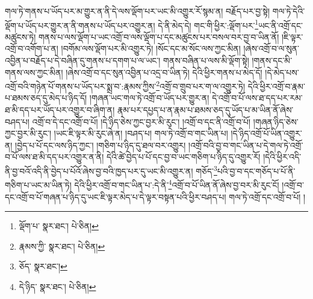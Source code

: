 གལ་ཏེ་གནས་པ་ཡོད་པར་མ་གྱུར་ན་ནི་དེ་ལས་ལྡོག་པར་ཡང་མི་འགྱུར་རོ་སྙམ་ན། བརྗོད་པར་བྱ་སྟེ། གལ་ཏེ་དེའི་ལྡོག་པ་ཡོད་པར་གྱུར་ན་ནི་གནས་པ་ཡོད་པར་འགྱུར་ན། དེ་ནི་མེད་དེ། གང་གི་ཕྱིར་:ལྡོག་པར་\footnote{ལྡོག་པ་  སྣར་ཐང་།  པེ་ཅིན། }ཡང་ནི་འགྲོ་དང་མཚུངས་ཏེ། གནས་པ་ལས་ལྡོག་པ་ཡང་འགྲོ་བ་ལས་ལྡོག་པ་དང་མཚུངས་པར་བསལ་བར་བྱ་བ་ཡིན་ནོ། །ཇི་ལྟར་འགྲོ་བ་འགོག་པ་ན། །བགོམ་ལས་ལྡོག་པར་མི་འགྱུར་ཏེ། །སོང་དང་མ་སོང་ལས་ཀྱང་མིན། །ཞེས་འགྲོ་བ་ལ་སུན་འབྱིན་པ་བརྗོད་པ་དེ་བཞིན་དུ་གནས་པ་དགག་པ་ལ་ཡང་། གནས་བཞིན་པ་ལས་མི་ལྡོག་སྟེ། །གནས་དང་མི་གནས་ལས་ཀྱང་མིན། །ཞེས་འགྲོ་བ་དང་སུན་འབྱིན་པ་འདྲ་བ་ཡིན་ཏེ། དེའི་ཕྱིར་གནས་པ་མེད་དོ། །དེ་མེད་པས་འགྲོ་བའི་གཉེན་པོ་གནས་པ་ཡོད་པར་སྨྲ་བ་:རྣམས་ཀྱིས་\footnote{རྣམས་ཀྱི་  སྣར་ཐང་།  པེ་ཅིན། }འགྲོ་བ་གྲུབ་པར་ག་ལ་འགྱུར་ཏེ། དེའི་ཕྱིར་འགྲོ་བ་རྣམ་པ་ཐམས་ཅད་དུ་མེད་པ་ཉིད་དོ། །གཞན་ཡང་གལ་ཏེ་འགྲོ་བ་ཡོད་པར་གྱུར་ན། དེ་འགྲོ་བ་པོ་ལས་ཐ་དད་པར་རམ་ཐ་མི་དད་པར་ཡོད་པར་འགྱུར་བ་ཞིག་ན། རྣམ་པར་དཔྱད་པ་ན་རྣམ་པ་ཐམས་ཅད་དུ་ཡོད་པ་མ་ཡིན་ནོ་ཞེས་བཤད་པ། འགྲོ་བ་དེ་དང་འགྲོ་བ་པོ། །དེ་ཉིད་ཅེས་ཀྱང་བྱར་མི་རུང་། །འགྲོ་བ་དང་ནི་འགྲོ་བ་པོ། །གཞན་ཉིད་ཅེས་ཀྱང་བྱར་མི་རུང་། །ཡང་ཇི་ལྟར་མི་རུང་ཞེ་ན། །བཤད་པ། གལ་ཏེ་འགྲོ་བ་གང་ཡིན་པ། །དེ་ཉིད་འགྲོ་པོ་ཡིན་འགྱུར་ན། །བྱེད་པ་པོ་དང་ལས་ཉིད་ཀྱང་། །གཅིག་པ་ཉིད་དུ་ཐལ་བར་འགྱུར། །འགྲོ་བའི་བྱ་བ་གང་ཡིན་པ་དེ་གལ་ཏེ་འགྲོ་བ་པོ་ལས་ཐ་མི་དད་པར་འགྱུར་ན་ནི། དེའི་ཚེ་བྱེད་པ་པོ་དང་བྱ་བ་ཡང་གཅིག་པ་ཉིད་དུ་འགྱུར་རོ། །དེའི་ཕྱིར་འདི་ནི་བྱ་བའོ་འདི་ནི་བྱེད་པ་པོའོ་ཞེས་བྱ་བའི་ཁྱད་པར་དུ་ཡང་མི་འགྱུར་ན། གཅོད་\footnote{ཅོད་  སྣར་ཐང་། }པའི་བྱ་བ་དང་གཅོད་པ་པོ་ནི་གཅིག་པ་ཡང་མ་ཡིན་ཏེ། དེའི་ཕྱིར་འགྲོ་བ་གང་ཡིན་པ་:དེ་ནི་\footnote{དེ་ཉིད་  སྣར་ཐང་།  པེ་ཅིན། }འགྲོ་བ་པོ་ཡིན་ནོ་ཞེས་བྱ་བར་མི་རུང་ངོ། །འགྲོ་བ་དང་འགྲོ་བ་པོ་གཞན་པ་ཉིད་དུ་ཡང་ཇི་ལྟར་མེད་པ་དེ་ལྟར་བསྟན་པའི་ཕྱིར་བཤད་པ། གལ་ཏེ་འགྲོ་དང་འགྲོ་བ་པོ། །
